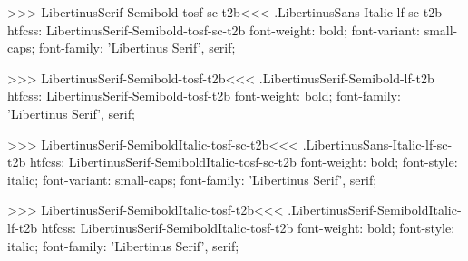 {{{{{{{{{{>>>
\<LibertinusSerif-Semibold-tosf-sc-t2b\><<<
.LibertinusSans-Italic-lf-sc-t2b
htfcss:  LibertinusSerif-Semibold-tosf-sc-t2b  font-weight: bold; font-variant: small-caps; font-family: 'Libertinus Serif', serif;

>>>
\<LibertinusSerif-Semibold-tosf-t2b\><<<
.LibertinusSerif-Semibold-lf-t2b
htfcss:  LibertinusSerif-Semibold-tosf-t2b  font-weight: bold; font-family: 'Libertinus Serif', serif;

>>>
\<LibertinusSerif-SemiboldItalic-tosf-sc-t2b\><<<
.LibertinusSans-Italic-lf-sc-t2b
htfcss:  LibertinusSerif-SemiboldItalic-tosf-sc-t2b  font-weight: bold; font-style: italic; font-variant: small-caps; font-family: 'Libertinus Serif', serif;

>>>
\<LibertinusSerif-SemiboldItalic-tosf-t2b\><<<
.LibertinusSerif-SemiboldItalic-lf-t2b
htfcss:  LibertinusSerif-SemiboldItalic-tosf-t2b  font-weight: bold; font-style: italic; font-family: 'Libertinus Serif', serif;

}}}}}}}}}}
